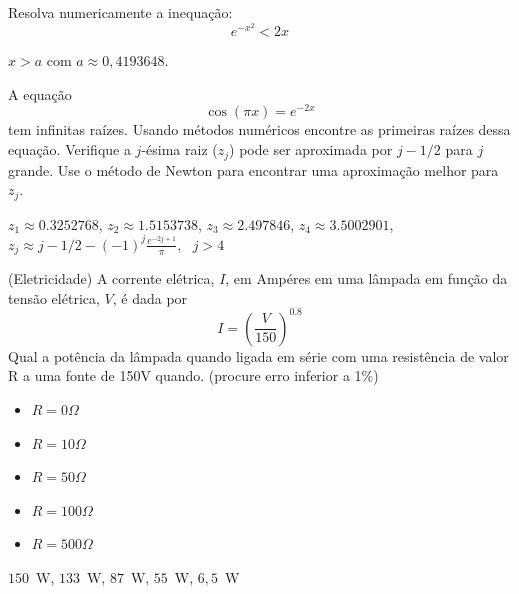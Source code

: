 \begin{exer} Resolva numericamente a inequação:
  \begin{equation}
    e^{-x^2}<2x
  \end{equation}
\end{exer}
\begin{resp}

    $x>a$ com $a\approx 0,4193648$.

\end{resp}


\begin{exer} A equação \begin{equation} \cos(\pi x)=e^{-2x} \end{equation} tem infinitas raízes.
Usando  métodos numéricos encontre as primeiras raízes dessa equação. Verifique a $j$-ésima raiz ($z_j$) pode ser aproximada por $j-1/2$ para $j$ grande. Use o método de Newton para encontrar uma aproximação melhor para $z_j$.
\end{exer}
\begin{resp}

 $z_1\approx 0.3252768 $, $z_2\approx 1.5153738$, $z_3\approx 2.497846  $, $z_4\approx 3.5002901$, $z_j\approx j-1/2-(-1)^j\frac{e^{-2j+1}}{\pi}, ~~~j>4$

\end{resp}


\begin{exer}(Eletricidade) A corrente elétrica, $I$, em Ampéres em uma lâmpada em função da tensão elétrica, $V$, é dada por
\begin{equation} I=\left(\frac{V}{150}\right)^{0.8} \end{equation}
Qual a potência da lâmpada quando ligada em série com uma resistência de valor R a uma fonte de 150V quando. (procure erro inferior a 1\%)
\begin{itemize}
\item [a)] $R=0\Omega$
\item [b)] $R=10\Omega$
\item [c)] $R=50\Omega$
\item [d)] $R=100\Omega$
\item [E)] $R=500\Omega$
\end{itemize}
\end{exer}
\begin{resp}

$150$~W, $133$~W, $87$~W, $55$~W, $6,5$~W

\end{resp}

